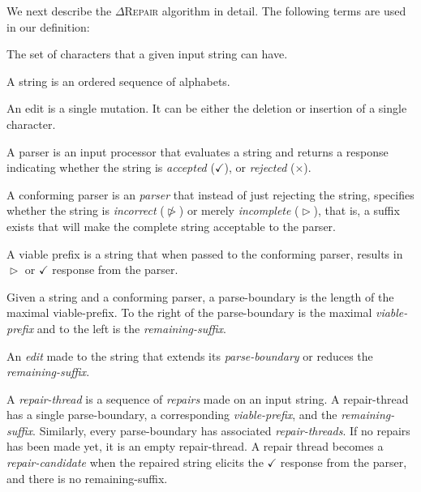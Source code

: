 \documentclass[sigconf,review,anonymous]{acmart}
\def\Rincomplete{\texttt{\color{incompletecolor}\textbf{$\vartriangleright$}}\xspace}
\def\Rincorrect{\texttt{\color{incorrectcolor}\textbf{$\ntriangleright$}}\xspace}
\def\Rvalid{\texttt{\color{validcolor}\textbf{$\checkmark$}}\xspace}
\def\Rreject{\texttt{\color{incorrectcolor}\textbf{$\times$}}\xspace}
\newcommand{\approach}{\textsc{$\Delta$Repair}\xspace}
\newcommand{\drepair}{\approach}
\begin{document}
We next describe the \drepair algorithm in detail.
The following terms are used in our definition: %
\begin{description}[labelwidth=!, labelindent=0pt]
\item[alphabet] The set of characters that a given input string can have.

\item[string] A string is an ordered sequence of alphabets.

\item[edit] An edit is a single mutation. It can be either the deletion
or insertion of a single character.

\item[parser] A parser is an input processor that evaluates a string and returns
a response indicating whether the string is \emph{accepted} (\Rvalid), or \emph{rejected} (\Rreject).

\item[conforming parser] A conforming parser is an \emph{parser} that 
instead of just rejecting the string, specifies whether
    the string is \emph{incorrect} (\Rincorrect) or merely \emph{incomplete} (\Rincomplete), that is, a suffix exists that
will make the complete string acceptable to the parser.

\item[viable-prefix] A viable prefix is a string that when passed to the conforming parser,
 results in \Rincomplete or \Rvalid response from the parser.

\item[parse-boundary] Given a string and a conforming parser, a parse-boundary is the
length of the maximal viable-prefix. To the right of the parse-boundary is the maximal
\emph{viable-prefix} and to the left is the \emph{remaining-suffix}.

\item[repair] An \emph{edit} made to the string that extends its \emph{parse-boundary}
  or reduces the \emph{remaining-suffix}.

\item[repair-thread] A \emph{repair-thread} is a sequence of \emph{repairs} made on an
input string. A repair-thread has a single parse-boundary, a corresponding
\emph{viable-prefix}, and the \emph{remaining-suffix}.
Similarly, every parse-boundary has associated \emph{repair-threads}.
If no repairs has been made yet, it is an empty repair-thread.
A repair thread becomes a \emph{repair-candidate} when the repaired string
elicits the \Rvalid response from the parser, and there is no remaining-suffix.


\end{description}
\end{document}
